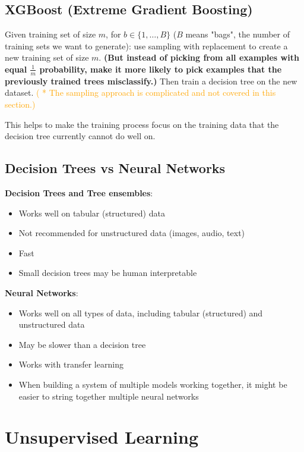 \documentclass{article}
\begin{document}
\subsection{XGBoost (Extreme Gradient Boosting)}

Given training set of size \(m\), for \(b \in \{1, \dots, B\}\) (\(B\) means "bags", the number of training sets we want to generate): use sampling with replacement to create a new training set of size \(m\). \textbf{(But instead of picking from all examples with equal \(\frac{1}{m}\) probability, make it more likely to pick examples that the previously trained trees misclassify.)} Then train a decision tree on the new dataset. \textcolor{orange}{( * The sampling approach is complicated and not covered in this section.)}

This helps to make the training process focus on the training data that the decision tree currently cannot do well on.

\subsection{Decision Trees vs Neural Networks}

\textbf{Decision Trees and Tree ensembles}:
\begin{itemize}
    \item Works well on tabular (structured) data
    \item Not recommended for unstructured data (images, audio, text)
    \item Fast
    \item Small decision trees may be human interpretable
\end{itemize}

\textbf{Neural Networks}:
\begin{itemize}
    \item Works well on all types of data, including tabular (structured) and unstructured data
    \item May be slower than a decision tree
    \item Works with transfer learning
    \item When building a system of multiple models working together, it might be easier to string together multiple neural networks
\end{itemize}

\section{Unsupervised Learning}
\end{document}
